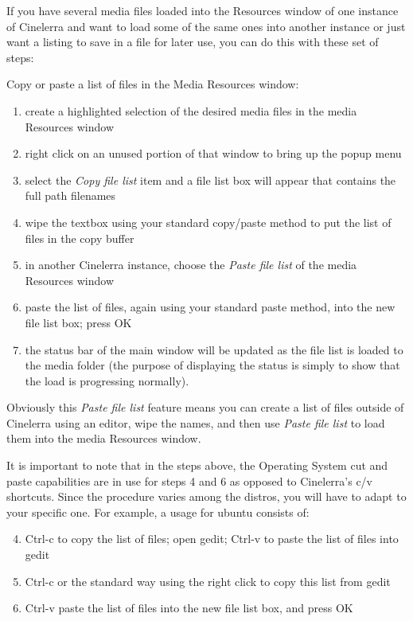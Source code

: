 If you have several media files loaded into the Resources window of one instance of Cinelerra and want to load some of the same ones into another instance or just want a listing to save in a file for later use, you can do this with these set of steps:

Copy or paste a list of files in the Media Resources window:  


\begin{enumerate}
    \item  create a highlighted selection of the desired media files in the media Resources window
    \item    right click on an unused portion of that window to bring up the popup menu
    \item     select the \textit{Copy file list} item and a file list box will appear that contains the full path filenames
    \item     wipe the textbox using your standard copy/paste method to put the list of files in the copy buffer
    \item     in another Cinelerra instance, choose the \textit{Paste file list} of the media Resources window
    \item     paste the list of files, again using your standard paste method, into the new file list box; press OK
    \item    the status bar of the main window will be updated as the file list is loaded to the media folder (the purpose of displaying the status is simply to show that the load is progressing normally).
\end{enumerate}

Obviously this \textit{Paste file list} feature means you can create a list of files outside of Cinelerra using an editor, wipe the names, and then use \textit{Paste file list} to load them into the media Resources window.  

It is important to note that in the steps above, the Operating System cut and paste capabilities are in use for steps 4 and 6 as opposed to Cinelerra’s c/v shortcuts.  
Since the procedure varies among the distros, you will have to adapt to your specific one.  For example, a usage for ubuntu consists of:
\begin{enumerate}
    \setcounter{enumi}{3}
    \item   Ctrl-c to copy the list of files; open gedit; Ctrl-v to paste the list of files into gedit
    \item   Ctrl-c or the standard way using the right click to copy this list from gedit
    \item Ctrl-v paste the list of files into the new file list box, and press OK
\end{enumerate}

